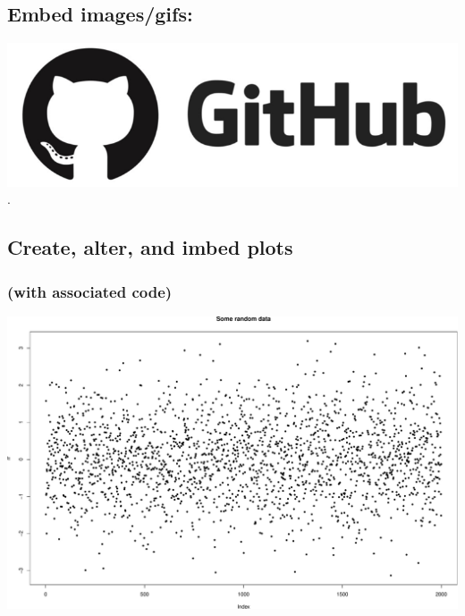 \documentclass[10,portrait]{article}
\begin{document}
\subsection{Embed images/gifs:}\label{embed-imagesgifs}

\includegraphics{githublogo.png}.

\newpage  

\subsection{Create, alter, and imbed
plots}\label{create-alter-and-imbed-plots}

\subsubsection{(with associated code)}\label{with-associated-code}

\includegraphics{R_is_dope_files/figure-latex/unnamed-chunk-3-1.pdf}

\newpage  
\end{document}
